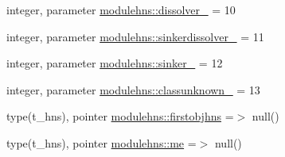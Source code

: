 \begin{DoxyCompactItemize}
integer, parameter \mbox{\hyperlink{namespacemodulehns_ac3d664a8e67e552a9295f78c85e458a4}{modulehns\+::dissolver\+\_\+}} = 10
\item 
integer, parameter \mbox{\hyperlink{namespacemodulehns_aa0404cd5f1d8c21f47bd63bdc49da335}{modulehns\+::sinkerdissolver\+\_\+}} = 11
\item 
integer, parameter \mbox{\hyperlink{namespacemodulehns_ae96b2e85a4537b419fe1a12258982859}{modulehns\+::sinker\+\_\+}} = 12
\item 
integer, parameter \mbox{\hyperlink{namespacemodulehns_a358b7b669ccd8504299b7c44c39cad28}{modulehns\+::classunknown\+\_\+}} = 13
\item 
type(t\+\_\+hns), pointer \mbox{\hyperlink{namespacemodulehns_a9a4e8bc013590ee0dbb507ba6c44064a}{modulehns\+::firstobjhns}} =$>$ null()
\item 
type(t\+\_\+hns), pointer \mbox{\hyperlink{namespacemodulehns_a98081b0b751e146911fdbbdfc6bb2320}{modulehns\+::me}} =$>$ null()
\end{DoxyCompactItemize}
